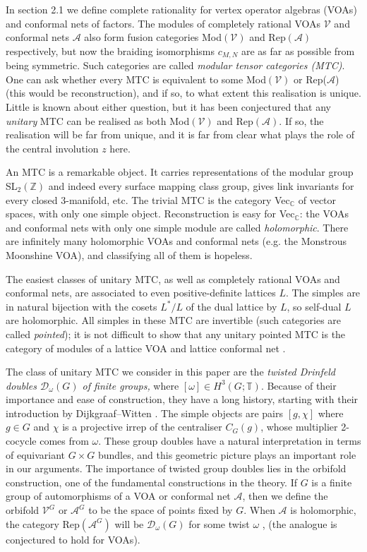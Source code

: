 \documentclass[12pt]{article}
\numberwithin{equation}{section}
\def\cA            {{\mathcal{A}}}
\def\cD            {{\mathcal{D}}}
\def\cV            {{\mathcal{V}}}
\def\bbC           {\mathbb{C}}
\def\bbT           {\mathbb{T}}
\def\bbZ           {\mathbb{Z}}
\begin{document}
In section 2.1 we define complete rationality for vertex operator algebras (VOAs) and
conformal nets of factors.
The modules of completely rational VOAs $\cV$ and conformal nets  $\cA$ also form fusion categories Mod$(\cV)$ and Rep$(\cA)$ respectively, but now the braiding isomorphisms $c_{M,N}$ are  as far as possible from being symmetric. Such categories are called \textit{modular tensor categories (MTC)}. One can ask whether every MTC is equivalent to some Mod$(\cV)$ or Rep($\cA$) (this would be reconstruction), and if so, to what extent this realisation is unique. Little is known about either question, but it has been
conjectured that any \textit{unitary} MTC can be realised as both Mod$(\cV)$ and Rep$(\cA)$. If so, the realisation will be far from unique, and it is far from clear what plays the role of the central involution $z$ here.

An MTC is a remarkable object. It carries representations of the modular group SL$_2(\bbZ)$ and indeed every surface mapping class group, gives link invariants for every closed 3-manifold, etc. The trivial MTC is the category Vec$_\bbC$ of vector spaces, with only one simple object. 
Reconstruction is easy for Vec$_\bbC$: the VOAs and conformal nets with only one simple module are called \textit{holomorphic}. There are infinitely many holomorphic VOAs and conformal nets (e.g.
the Monstrous Moonshine VOA), and classifying all of them is hopeless. 

The easiest classes of unitary MTC, as well as completely rational VOAs and conformal nets, are associated to even positive-definite lattices $L$. The simples are in natural bijection
with the cosets $L^*/L$ of the dual lattice by $L$, so self-dual $L$ are holomorphic. All simples in these MTC 
are invertible (such categories are called \textit{pointed}); it is not difficult to
show that any unitary pointed MTC is the category of modules of a lattice VOA and lattice conformal net
\cite{EG7}.

The class of unitary MTC we consider in this paper are the \textit{twisted Drinfeld doubles $\cD_\omega(G)$ of finite groups,} where $[\omega]\in H^3(G;\bbT)$. Because of their importance and ease of construction, they have a long history, starting with their introduction by Dijkgraaf--Witten \cite{DW}. The simple objects are pairs $[g,\chi]$ where $g\in G$  and $\chi$ is a projective irrep of the centraliser $C_G(g)$, whose multiplier 2-cocycle comes from $\omega$. These group doubles have a natural interpretation in terms of equivariant $G\times G$ bundles, and this geometric picture plays an important role in our arguments.    The importance of twisted group doubles lies in the orbifold construction, one of the fundamental constructions in the theory.  If $G$ is a finite group of automorphisms of a  VOA or conformal net $\cA$, then we define the orbifold $\cV^G$ or $\cA^G$ to be  the space of points fixed by  $G$.  When $\cA$ is holomorphic, the category Rep$(\cA^G)$ will be $\cD_\omega(G)$ for some twist $\omega$ \cite{Xu},\cite{Kir} (the analogue is conjectured to hold for VOAs). 
\end{document}

